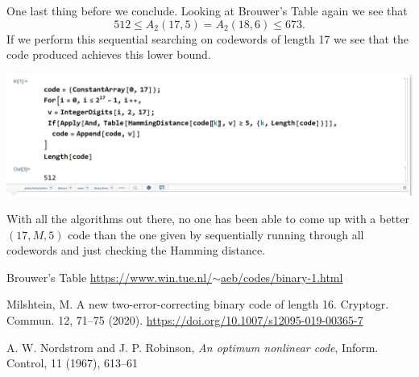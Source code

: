 \documentclass{article}
\theoremstyle{remark}
\begin{document}
	One last thing before we conclude.  Looking at Brouwer's Table \cite{Brouwer} again we see that
	\begin{equation*}
		512\leq A_2(17,5)=A_2(18,6)\leq 673.
	\end{equation*}
	If we perform this sequential searching on codewords of length 17 we see that the code produced achieves this lower bound.
	\begin{center}
		\includegraphics[width=15cm]{sequential code 512}
	\end{center}
	With all the algorithms out there, no one has been able to come up with a better $(17,M,5)$ code than the one given by sequentially running through all codewords and just checking the Hamming distance.
	\begin{thebibliography}{9}
		Brouwer's Table  \href{https://www.win.tue.nl/~aeb/codes/binary-1.html}{https://www.win.tue.nl/$\sim$aeb/codes/binary-1.html}
		
		Milshtein, M. A new two-error-correcting binary code of length 16. Cryptogr. Commun. 12, 71–75 (2020). \href{https://doi.org/10.1007/s12095-019-00365-7}{https://doi.org/10.1007/s12095-019-00365-7}
		
		 A. W. Nordstrom and J. P. Robinson, \textit{An optimum nonlinear code}, Inform. Control,
		11 (1967), 613–61
	\end{thebibliography}
	
	
	
\end{document}
